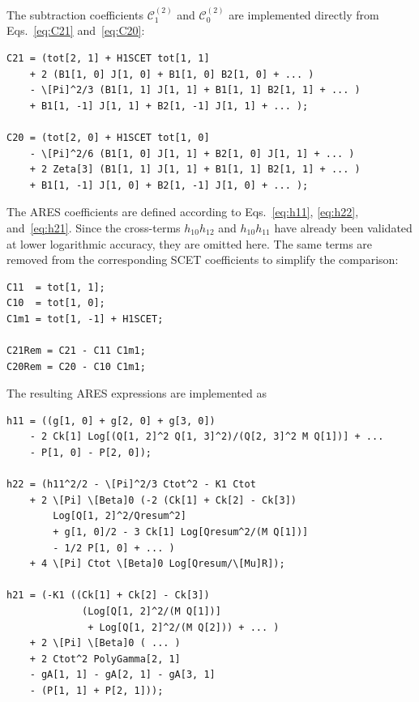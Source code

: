 The subtraction coefficients $\mathcal{C}^{(2)}_1$ and
$\mathcal{C}^{(2)}_0$ are implemented directly from
Eqs.~\eqref{eq:C21} and~\eqref{eq:C20}:
\begin{lstlisting}[style=mma, caption={Implementation of
$\mathcal{C}^{(2)}_1$ and $\mathcal{C}^{(2)}_0$.}]
C21 = (tot[2, 1] + H1SCET tot[1, 1]
    + 2 (B1[1, 0] J[1, 0] + B1[1, 0] B2[1, 0] + ... )
    - \[Pi]^2/3 (B1[1, 1] J[1, 1] + B1[1, 1] B2[1, 1] + ... )
    + B1[1, -1] J[1, 1] + B2[1, -1] J[1, 1] + ... );

C20 = (tot[2, 0] + H1SCET tot[1, 0]
    - \[Pi]^2/6 (B1[1, 0] J[1, 1] + B2[1, 0] J[1, 1] + ... )
    + 2 Zeta[3] (B1[1, 1] J[1, 1] + B1[1, 1] B2[1, 1] + ... )
    + B1[1, -1] J[1, 0] + B2[1, -1] J[1, 0] + ... );
\end{lstlisting}

The \textsc{ARES} coefficients are defined according to
Eqs.~\eqref{eq:h11}, \eqref{eq:h22}, and~\eqref{eq:h21}. Since the
cross-terms $h_{10}h_{12}$ and $h_{10}h_{11}$ have already been validated
at lower logarithmic accuracy, they are omitted here. The same terms are
removed from the corresponding SCET coefficients to simplify the
comparison:
\begin{lstlisting}[style=mma, caption={Removal of the cross-terms already
validated in the \textsc{ARES} coefficients.}]
C11  = tot[1, 1];
C10  = tot[1, 0];
C1m1 = tot[1, -1] + H1SCET;

C21Rem = C21 - C11 C1m1;
C20Rem = C20 - C10 C1m1;
\end{lstlisting}

The resulting \textsc{ARES} expressions are implemented as
\begin{lstlisting}[style=mma, caption={Implementation of the \textsc{ARES}
expansion coefficients $h_{11}$, $h_{22}$ and $h_{21}$.}]
h11 = ((g[1, 0] + g[2, 0] + g[3, 0])
    - 2 Ck[1] Log[(Q[1, 2]^2 Q[1, 3]^2)/(Q[2, 3]^2 M Q[1])] + ...
    - P[1, 0] - P[2, 0]);

h22 = (h11^2/2 - \[Pi]^2/3 Ctot^2 - K1 Ctot
    + 2 \[Pi] \[Beta]0 (-2 (Ck[1] + Ck[2] - Ck[3])
        Log[Q[1, 2]^2/Qresum^2]
        + g[1, 0]/2 - 3 Ck[1] Log[Qresum^2/(M Q[1])]
        - 1/2 P[1, 0] + ... )
    + 4 \[Pi] Ctot \[Beta]0 Log[Qresum/\[Mu]R]);

h21 = (-K1 ((Ck[1] + Ck[2] - Ck[3])
             (Log[Q[1, 2]^2/(M Q[1])]
              + Log[Q[1, 2]^2/(M Q[2])) + ... )
    + 2 \[Pi] \[Beta]0 ( ... )
    + 2 Ctot^2 PolyGamma[2, 1]
    - gA[1, 1] - gA[2, 1] - gA[3, 1]
    - (P[1, 1] + P[2, 1]));
\end{lstlisting}

